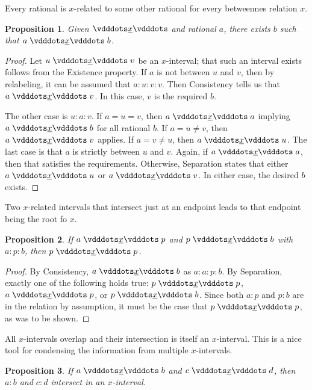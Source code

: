 \documentclass{rmj-public}
\newtheorem{proposition}{Proposition}[section]
\begin{document}
Every rational is $x$-related to some other rational for every betweennes relation $x$. 

\begin{proposition}\label{br:existence}
    Given $\xrel$ and rational $a$, there exists $b$ such that $a \xrel b$. 
\end{proposition}

\begin{proof}
    Let $u \xrel v$ be an $x$-interval; that such an interval exists follows from the Existence property. If $a$ is not between $u$ and $v$, then by relabeling, it can be assumed that $a:u:v:v$. Then Consistency tells us that $a \xrel v$. In this case, $v$ is the required $b$. 

    The other case is $u:a:v$. If $a = u = v$, then $a \xrel a$ implying $a \xrel b$ for all rational $b$.  If $a = u \neq v$, then $a \xrel v$ applies. If $a  = v \neq u$, then $a \xrel u$. The last case is that $a$ is strictly between $u$ and $v$. Again, if $a \xrel a$, then that satisfies the requirements. Otherwise, Separation states that either $a \xrel u$ or $a \xrel v$. In either case, the desired $b$ exists. 
\end{proof}

Two $x$-related intervals that intersect just at an endpoint leads to that endpoint being the root fo $x$. 

\begin{proposition}\label{br:endpointed}
    If $a \xrel p$ and $p \xrel b$ with $a:p:b$, then $p \xrel p$.
\end{proposition}

\begin{proof}
    By Consistency, $a \xrel b$ as $a:a:p:b$.  By Separation, exactly one of the following holds true: $p \xrel p$,  \sout{$a \xrel p$}, or \sout{$p \xrel b$}. Since both $a:p$ and $p:b$ are in the relation by assumption, it must be the case that $p \xrel p$, as was to be shown. 
\end{proof}

All $x$-intervals overlap and their intersection is itself an $x$-interval. This is a nice tool for condensing the information from multiple $x$-intervals. 

\begin{proposition}\label{br:intersect}
    If $a \xrel b$ and $c \xrel d$, then $a:b$ and $c:d$ intersect in an $x$-interval. 
\end{proposition}
\end{document}

